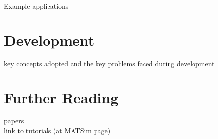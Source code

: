 Example applications

\section{Development}
key concepts adopted and the key problems faced during development
 

\section{Further Reading}
papers \\

link to tutorials (at MATSim page)

